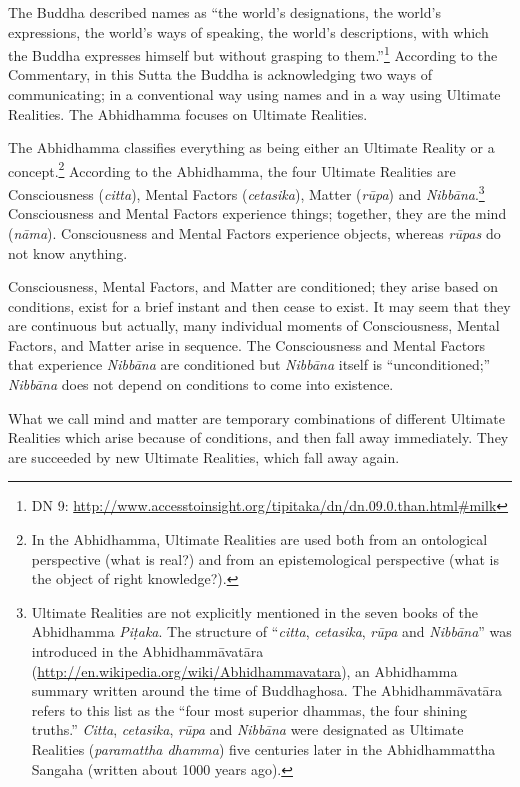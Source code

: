 The Buddha described names as “the world’s designations, the world’s expressions, the world’s ways of speaking, the world’s descriptions, with which the Buddha expresses himself but without grasping to them.”\footnote{DN 9: \url{http://www.accesstoinsight.org/tipitaka/dn/dn.09.0.than.html\#milk}} According to the Commentary, in this Sutta the Buddha is acknowledging two ways of communicating; in a conventional way using names and in a way using Ultimate Realities. The Abhidhamma focuses on Ultimate Realities.

The Abhidhamma classifies everything as being either an Ultimate Reality or a concept.\footnote{In the Abhidhamma, Ultimate Realities are used both from an ontological perspective (what is real?) and from an epistemological perspective (what is the object of right knowledge?).} According to the Abhidhamma, the four Ultimate Realities are Consciousness (\textit{citta}), Mental Factors (\textit{cetasika}), Matter (\textit{rūpa}) and \textit{Nibbāna}.\footnote{Ultimate Realities are not explicitly mentioned in the seven books of the Abhidhamma \textit{Piṭaka}. The structure of “\textit{citta}, \textit{cetasika}, \textit{rūpa} and \textit{Nibbāna}” was introduced in the Abhidhammāvatāra (\url{http://en.wikipedia.org/wiki/Abhidhammavatara}), an Abhidhamma summary written around the time of Buddhaghosa. The Abhidhammāvatāra refers to this list as the “four most superior dhammas, the four shining truths.” \textit{Citta}, \textit{cetasika}, \textit{rūpa} and \textit{Nibbāna} were designated as Ultimate Realities (\textit{paramattha dhamma}) five centuries later in the Abhidhammattha Sangaha (written about 1000 years ago).} Consciousness and Mental Factors experience things; together, they are the mind (\textit{nāma}). Consciousness and Mental Factors experience objects, whereas \textit{rūpas} do not know anything. 

Consciousness, Mental Factors, and Matter are conditioned; they arise based on conditions, exist for a brief instant and then cease to exist. It may seem that they are continuous but actually, many individual moments of Consciousness, Mental Factors, and Matter arise in sequence. The Consciousness and Mental Factors that experience \textit{Nibbāna} are conditioned but \textit{Nibbāna} itself is “unconditioned;” \textit{Nibbāna} does not depend on conditions to come into existence.

What we call mind and matter are temporary combinations of different Ultimate Realities which arise because of conditions, and then fall away immediately. They are succeeded by new Ultimate Realities, which fall away again.

